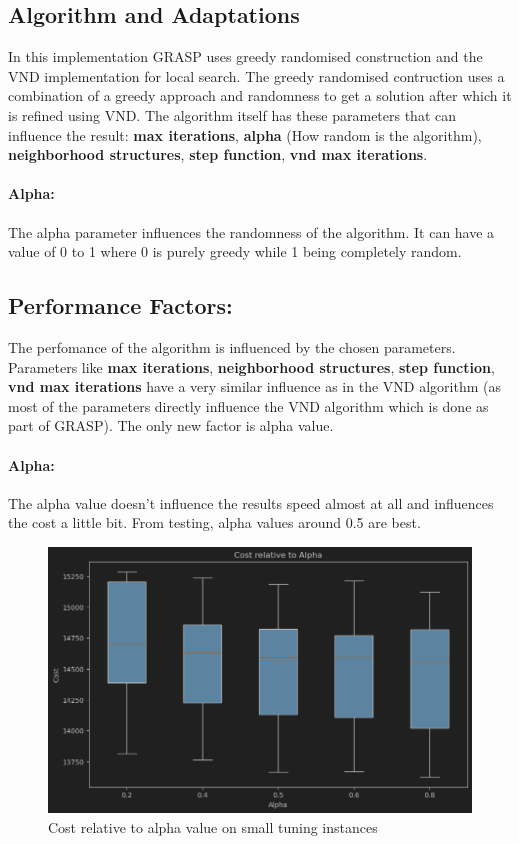 \documentclass{article}
\begin{document}
\subsection*{Algorithm and Adaptations}
In this implementation GRASP uses greedy randomised construction and the VND implementation for local search.  The greedy randomised contruction uses a combination of a greedy approach and randomness to get a solution after which it is refined using VND. The algorithm itself has these parameters that can influence the result: \textbf{max iterations}, \textbf{alpha} (How random is the algorithm), \textbf{neighborhood structures}, \textbf{step function}, \textbf{vnd max iterations}.

\paragraph{Alpha:}
The alpha parameter influences the randomness of the algorithm. It can have a value of 0 to 1 where 0 is purely greedy while 1 being completely random.

\subsection*{Performance Factors:}
The perfomance of the algorithm is influenced by the chosen parameters. Parameters like \textbf{max iterations}, \textbf{neighborhood structures}, \textbf{step function}, \textbf{vnd max iterations} have a very similar influence as in the VND algorithm (as most of the parameters directly influence the VND algorithm which is done as part of GRASP). The only new factor is alpha value.

\paragraph*{Alpha:}
The alpha value doesn't influence the results speed almost at all and influences the cost a little bit. From testing, alpha values around 0.5 are best.

\begin{figure}[H]
	\includegraphics[width=\linewidth]{cost_alpha_grasp_small.png}
	\caption{Cost relative to alpha value on small tuning instances}
\end{figure}
\end{document}
